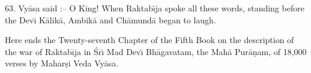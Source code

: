 63. Vy\=asa said :-- O King! When Raktab\={\i}ja spoke all these words, standing before the Dev\={\i} K\=alik\=a, Ambik\=a and Ch\=amund\=a began to laugh.

Here ends the Twenty-seventh Chapter of the Fifth Book on the description of the war of Raktab\={\i}ja in \'Sr\={\i} Mad Dev\={\i} Bh\=agavatam, the Mah\=a Pur\=a\d{n}am, of 18,000 verses by Mahar\d{s}i Veda Vy\=asa.



